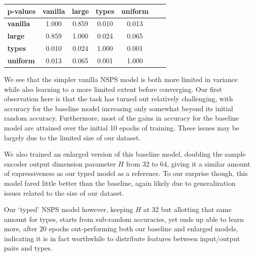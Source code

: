 \documentclass{article} %
\begin{document}
    \begin{tabular}{|l|c|c|c|c|c|c|} \hline
        \textbf{p-values}
        & \textbf{vanilla} & \textbf{large} & \textbf{types} & \textbf{uniform} \\ \hline
        \textbf{vanilla} & 1.000 & 0.859 & 0.010 & 0.013 \\ \hline
        \textbf{large} & 0.859 & 1.000 & 0.024 & 0.065 \\ \hline
        \textbf{types} & 0.010 & 0.024 & 1.000 & 0.001 \\ \hline
        \textbf{uniform} & 0.013 & 0.065 & 0.001 & 1.000 \\ \hline
    \end{tabular}
    \label{fig:ttest}

We see that the simpler vanilla NSPS model is both more limited in variance while also learning to a more limited extent before converging.
Our first observation here is that the task has turned out relatively challenging,
with accuracy for the baseline model increasing only somewhat beyond its initial random accuracy.
Furthermore, most of the gains in accuracy for the baseline model are attained over the initial 10 epochs of training.
These issues may be largely due to the limited size of our dataset.

We also trained an enlarged version of this baseline model,
doubling the sample encoder output dimension parameter $H$ from $32$ to $64$,
giving it a similar amount of expressiveness as our typed model as a reference.
To our surprise though, this model fared little better than the baseline,
again likely due to generalization issues related to the size of our dataset.

Our `typed' NSPS model however,
keeping $H$ at $32$ but allotting that same amount for types,
starts from sub-random accuracies, yet ends up able to learn more,
after $20$ epochs out-performing both our baseline and enlarged models,
indicating it is in fact worthwhile to distribute features between input/output pairs and types.
\end{document}
